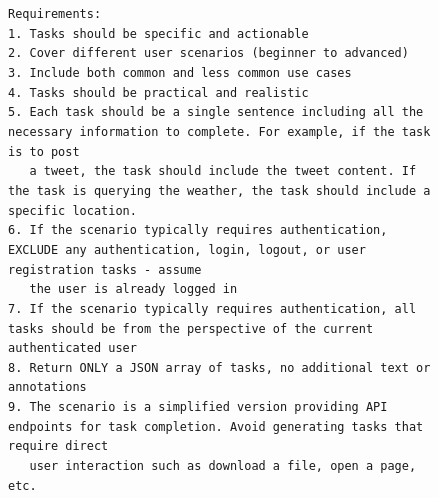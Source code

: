 \begin{figure}[p]
{\begin{minipage}{0.97\textwidth}
        \texttt{Requirements:}\\
        \texttt{1. Tasks should be specific and actionable}\\
        \texttt{2. Cover different user scenarios (beginner to advanced)}\\
        \texttt{3. Include both common and less common use cases}\\
        \texttt{4. Tasks should be practical and realistic}\\
        \texttt{5. Each task should be a single sentence including all the necessary information to complete. For example, if the task is to post}\\
        \texttt{~~~a tweet, the task should include the tweet content. If the task is querying the weather, the task should include a specific location.}\\
        \texttt{6. If the scenario typically requires authentication, EXCLUDE any authentication, login, logout, or user registration tasks - assume}\\
        \texttt{~~~the user is already logged in}\\
        \texttt{7. If the scenario typically requires authentication, all tasks should be from the perspective of the current authenticated user}\\
        \texttt{8. Return ONLY a JSON array of tasks, no additional text or annotations}\\
        \texttt{9. The scenario is a simplified version providing API endpoints for task completion. Avoid generating tasks that require direct}\\
        \texttt{~~~user interaction such as download a file, open a page, etc.}\\[4pt]


\end{minipage}}
\end{figure}
